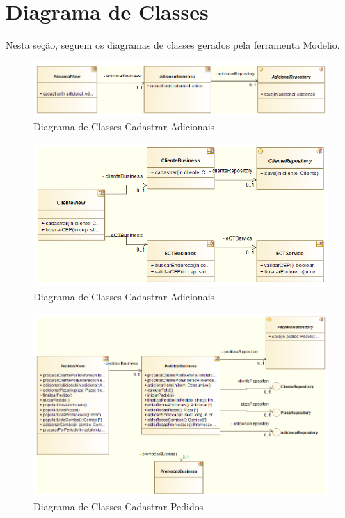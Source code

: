 \section{Diagrama de Classes}

Nesta seção, seguem os diagramas de classes gerados pela ferramenta Modelio.

\begin{figure}[h!]
 \centering
 \includegraphics[scale=0.5]{capitulo02/diagramaClassesCadastrarAdicionais.png}
 \caption{Diagrama de Classes Cadastrar Adicionais}
\end{figure}

\begin{figure}[h!]
 \centering
 \includegraphics[scale=0.5]{capitulo02/diagramaClassesCadastrarClientes.png}
 \caption{Diagrama de Classes Cadastrar Adicionais}
\end{figure}

\begin{figure}[h!]
 \centering
 \includegraphics[scale=0.5]{capitulo02/diagramaClassesCadastrarPedidos.png}
 \caption{Diagrama de Classes Cadastrar Pedidos}
\end{figure}

